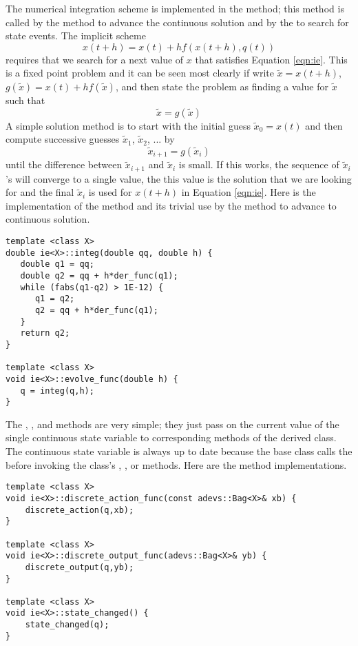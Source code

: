 The numerical integration scheme is implemented in the  method; this method is called by the  method to advance the continuous solution and by the  to search for state events. The implicit scheme
\begin{equation}
x(t+h) = x(t) + h f(x(t+h),q(t)) \label{eqn:ie}
\end{equation}
requires that we search for a next value of $x$ that satisfies Equation \ref{eqn:ie}. This is a fixed point problem and it can be seen most clearly if write $\tilde{x} = x(t+h)$, $g(\tilde{x}) = x(t)+hf(\tilde{x})$, and then state the problem as finding a value for $\tilde{x}$ such that
\begin{equation*}
\tilde{x} = g(\tilde{x})
\end{equation*}
A simple solution method is to start with the initial guess $\tilde{x}_0=x(t)$ and then compute successive guesses $\tilde{x}_1$, $\tilde{x}_2$, $...$ by
\begin{equation}
\tilde{x}_{i+1} = g(\tilde{x}_i) \label{eqn:ieiter}
\end{equation}
until the difference between $\tilde{x}_{i+1}$ and $\tilde{x}_i$ is small. If this works, the sequence of $\tilde{x}_i$'s will converge to a single value, the this value is the solution that we are looking for and the final $\tilde{x}_i$ is used for $x(t+h)$ in Equation \ref{eqn:ie}. Here is the implementation of the  method and its trivial use by the  method to advance to continuous solution.
\begin{verbatim}
template <class X>
double ie<X>::integ(double qq, double h) {
   double q1 = qq;
   double q2 = qq + h*der_func(q1);
   while (fabs(q1-q2) > 1E-12) {
      q1 = q2;
      q2 = qq + h*der_func(q1);
   }
   return q2;
}

template <class X>
void ie<X>::evolve_func(double h) {
   q = integ(q,h);
}
\end{verbatim}

The , , and  methods are very simple; they just pass on the current value of the single continuous state variable to corresponding methods of the derived class. The continuous state variable is always up to date because the  base class calls the  before invoking the  class's , , or  methods. Here are the method implementations.
\begin{verbatim}
template <class X>    
void ie<X>::discrete_action_func(const adevs::Bag<X>& xb) {
    discrete_action(q,xb);
}

template <class X>    
void ie<X>::discrete_output_func(adevs::Bag<X>& yb) {
    discrete_output(q,yb);
}

template <class X>    
void ie<X>::state_changed() {
    state_changed(q);
}
\end{verbatim}

